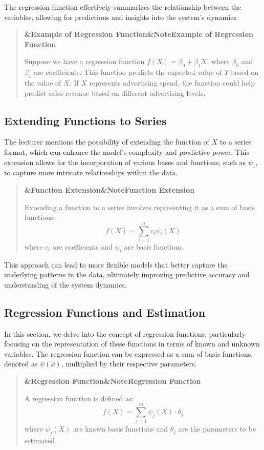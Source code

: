 \documentclass[a4paper]{article}
\newcommand{\boxheading}[1]{%
  \par\smallskip
  \noindent\textbf{\ifx&#1&Note\else#1\fi}\par
  \smallskip
}
\newenvironment{defbox}[1][]{%
  \begin{quote}\color{green!40!black}\boxheading{#1}\normalcolor
}{\end{quote}}
\newenvironment{exbox}[1][]{%
  \begin{quote}\color{brown!70!black}\boxheading{#1}\normalcolor
}{\end{quote}}
\newenvironment{rembox}[1][]{%
  \begin{quote}\color{black!70}\boxheading{#1}\normalcolor
}{\end{quote}}
\begin{document}
The regression function effectively summarizes the relationship between the variables, allowing for predictions and insights into the system's dynamics.

\begin{exbox}[Example of Regression Function]
Suppose we have a regression function \( f(X) = \beta_0 + \beta_1 X \), where \( \beta_0 \) and \( \beta_1 \) are coefficients. This function predicts the expected value of \( Y \) based on the value of \( X \). If \( X \) represents advertising spend, the function could help predict sales revenue based on different advertising levels.
\end{exbox}

\subsection{Extending Functions to Series}
The lecturer mentions the possibility of extending the function of \( X \) to a series format, which can enhance the model's complexity and predictive power. This extension allows for the incorporation of various bases and functions, such as \( \psi_1 \), to capture more intricate relationships within the data.

\begin{rembox}[Function Extension]
Extending a function to a series involves representing it as a sum of basis functions:
\[
f(X) = \sum_{i=1}^{n} c_i \psi_i(X)
\]
where \( c_i \) are coefficients and \( \psi_i \) are basis functions.
\end{rembox}

This approach can lead to more flexible models that better capture the underlying patterns in the data, ultimately improving predictive accuracy and understanding of the system dynamics.

\subsection{Regression Functions and Estimation}
In this section, we delve into the concept of regression functions, particularly focusing on the representation of these functions in terms of known and unknown variables. The regression function can be expressed as a sum of basis functions, denoted as \( \psi(x) \), multiplied by their respective parameters.

\begin{defbox}[Regression Function]
A regression function is defined as:
\[
f(X) = \sum_{j=1}^{m} \psi_j(X) \cdot \theta_j
\]
where \( \psi_j(X) \) are known basis functions and \( \theta_j \) are the parameters to be estimated.
\end{defbox}
\end{document}
